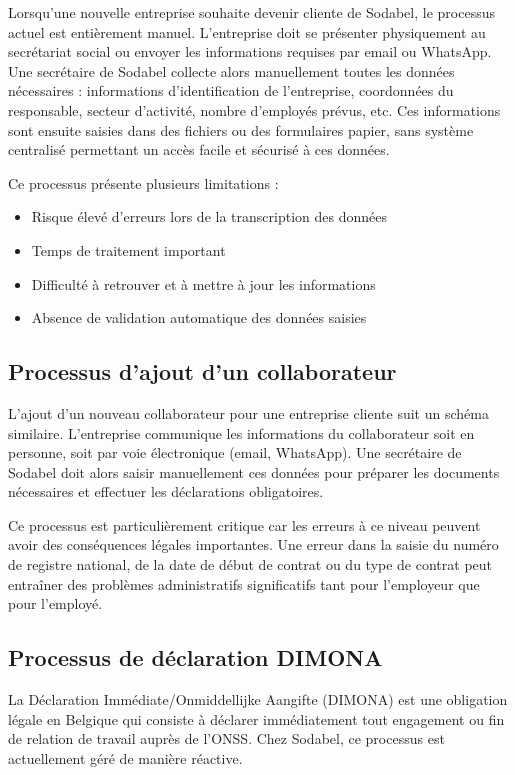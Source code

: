 Lorsqu'une nouvelle entreprise souhaite devenir cliente de Sodabel, le processus actuel est entièrement manuel. L'entreprise doit se présenter physiquement au secrétariat social ou envoyer les informations requises par email ou WhatsApp. Une secrétaire de Sodabel collecte alors manuellement toutes les données nécessaires : informations d'identification de l'entreprise, coordonnées du responsable, secteur d'activité, nombre d'employés prévus, etc. Ces informations sont ensuite saisies dans des fichiers ou des formulaires papier, sans système centralisé permettant un accès facile et sécurisé à ces données.

Ce processus présente plusieurs limitations :
\begin{itemize}
  \item Risque élevé d'erreurs lors de la transcription des données
  \item Temps de traitement important
  \item Difficulté à retrouver et à mettre à jour les informations
  \item Absence de validation automatique des données saisies
\end{itemize}

\subsection{Processus d'ajout d'un collaborateur}

L'ajout d'un nouveau collaborateur pour une entreprise cliente suit un schéma similaire. L'entreprise communique les informations du collaborateur soit en personne, soit par voie électronique (email, WhatsApp). Une secrétaire de Sodabel doit alors saisir manuellement ces données pour préparer les documents nécessaires et effectuer les déclarations obligatoires.

Ce processus est particulièrement critique car les erreurs à ce niveau peuvent avoir des conséquences légales importantes. Une erreur dans la saisie du numéro de registre national, de la date de début de contrat ou du type de contrat peut entraîner des problèmes administratifs significatifs tant pour l'employeur que pour l'employé.

\subsection{Processus de déclaration DIMONA}

La Déclaration Immédiate/Onmiddellijke Aangifte (DIMONA) est une obligation légale en Belgique qui consiste à déclarer immédiatement tout engagement ou fin de relation de travail auprès de l'ONSS. Chez Sodabel, ce processus est actuellement géré de manière réactive.

